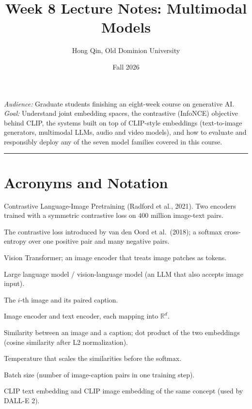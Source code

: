 \documentclass[11pt]{article}
\title{Week 8 Lecture Notes: Multimodal Models}
\author{Hong Qin, Old Dominion University}
\date{Fall 2026}
\newcommand{\R}{\mathbb{R}}
\theoremstyle{remark}
\newcommand{\fimg}{f_{\text{img}}}
\newcommand{\ftxt}{f_{\text{txt}}}
\newcommand{\simop}{\mathrm{sim}}
\begin{document}
\maketitle

\begin{center}
\textit{Audience:} Graduate students finishing an eight-week course on generative AI.\\
\textit{Goal:} Understand joint embedding spaces, the contrastive (InfoNCE) objective behind CLIP, the systems built on top of CLIP-style embeddings (text-to-image generators, multimodal LLMs, audio and video models), and how to evaluate and responsibly deploy any of the seven model families covered in this course.
\end{center}

\tableofcontents
\bigskip
\hrule
\bigskip

\section*{Acronyms and Notation}
\begin{description}[style=nextline,leftmargin=1.8em,labelsep=0.6em]
  \item[CLIP] Contrastive Language-Image Pretraining (Radford et al., 2021). Two encoders trained with a symmetric contrastive loss on 400 million image-text pairs.
  \item[InfoNCE] The contrastive loss introduced by van den Oord et al.\ (2018); a softmax cross-entropy over one positive pair and many negative pairs.
  \item[ViT] Vision Transformer; an image encoder that treats image patches as tokens.
  \item[LLM / VLM] Large language model / vision-language model (an LLM that also accepts image input).
  \item[$x_i, y_i$] The $i$-th image and its paired caption.
  \item[$\fimg, \ftxt$] Image encoder and text encoder, each mapping into $\R^d$.
  \item[$\simop(x,y)$] Similarity between an image and a caption; dot product of the two embeddings (cosine similarity after L2 normalization).
  \item[$\tau$] Temperature that scales the similarities before the softmax.
  \item[$N$] Batch size (number of image-caption pairs in one training step).
  \item[$z_{\text{text}}, z_{\text{img}}$] CLIP text embedding and CLIP image embedding of the same concept (used by DALL-E 2).
\end{description}
\end{document}
